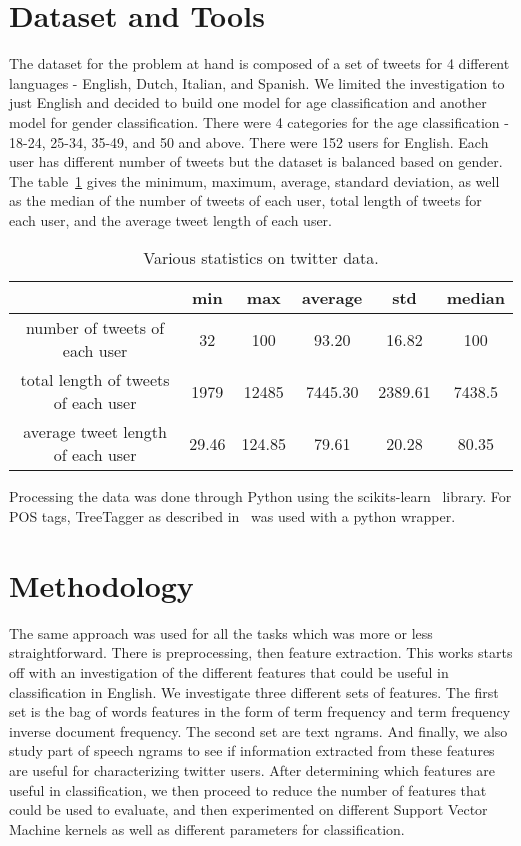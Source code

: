 \documentclass[a4paper]{llncs}
\begin{document}
\section{Dataset and Tools}
The dataset for the problem at hand is composed of a set of tweets for 4 different languages - English, Dutch, Italian, and Spanish. We limited the investigation to just English and decided to build one model for age classification and another model for gender classification. There were 4 categories for the age classification - 18-24, 25-34, 35-49, and 50 and above. There were 152 users for English. Each user has different number of tweets but the dataset is balanced based on gender. The table~\ref{table:TweetStats} gives the minimum, maximum, average, standard deviation, as well as the median of the number of tweets of each user, total length of tweets for each user, and the average tweet length of each user. 

\begin{table}[!htbp]
\centering
\begin{tabular}{|c|ccccc|}
\hline
                                    & min   & max    & average & std     & median \\ \hline
number of tweets of each user       & 32    & 100    & 93.20   & 16.82   & 100    \\ \hline
total length of tweets of each user & 1979  & 12485  & 7445.30 & 2389.61 & 7438.5 \\ \hline
average tweet length of each user   & 29.46 & 124.85 & 79.61   & 20.28   & 80.35  \\ \hline
\end{tabular}
\caption{Various statistics on twitter data.}
\label{table:TweetStats}
\end{table}

Processing the data was done through Python using the scikits-learn~\cite{scikit-learn} library. For POS tags, TreeTagger as described in~\cite{schmid1994probabilistic} was used with a python wrapper.
\section{Methodology}
The same approach was used for all the tasks which was more or less straightforward. There is preprocessing, then feature extraction. This works starts off with an investigation of the different features that could be useful in classification in English. We investigate three different sets of features. The first set is the bag of words features in the form of term frequency and term frequency inverse document frequency. The second set are text ngrams. And finally, we also study part of speech ngrams to see if information extracted from these features are useful for characterizing twitter users. After determining which features are useful in classification, we then proceed to reduce the number of features that could be used to evaluate, and then experimented on different Support Vector Machine kernels as well as different parameters for classification.
\end{document}

